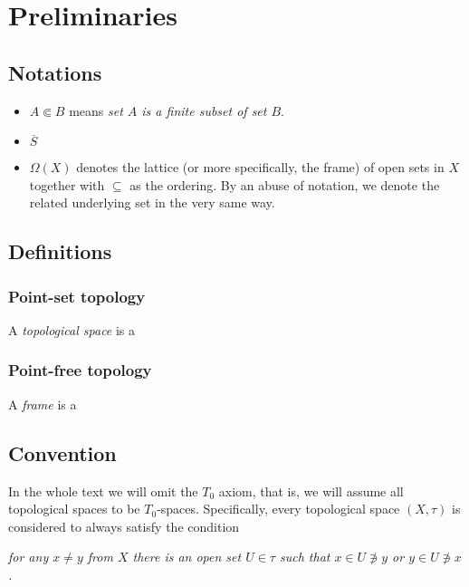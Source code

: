 \chapter*{Preliminaries}

\section*{Notations}

\begin{itemize}
\item $A \Subset B$ means {\sl set $A$ is a finite subset of set $B$\/}.
\item $\overline{S}$ 
\item $\Omega(X)$ denotes the lattice (or more specifically, the frame) of open
sets in $X$ together with $\subseteq$ as the ordering. 
By an abuse of notation, we denote the related underlying set in the very same
way.
\end{itemize}

\section*{Definitions}

\subsection*{Point-set topology}

A \emph{topological space} is a

\subsection*{Point-free topology}

A \emph{frame} is a

\section*{Convention}

In the whole text we will omit the $T_0$ axiom, that is, we will assume all
topological spaces to be $T_0$-spaces.
Specifically, every topological space $(X, \tau)$ is considered to always
satisfy the condition
\begin{center} \it
  for any $x \ne y$ from $X$ there is an open set $U \in \tau$ such that $x \in U
  \not\owns y$ or $y \in U \not\owns x$.
\end{center}
